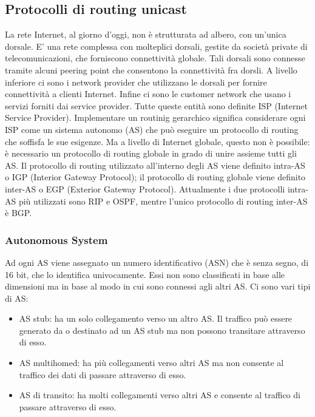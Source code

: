 \documentclass[12pt]{report}
\begin{document}
\subsection{Protocolli di routing unicast}
La rete Internet, al giorno d'oggi, non è strutturata ad albero, con un'unica dorsale. E' una rete complessa con molteplici dorsali, gestite da società private di telecomunicazioni, che forniscono connettività globale. Tali dorsali sono connesse tramite alcuni peering point che consentono la connettività fra dorsli. A livello inferiore ci sono i network provider che utilizzano le dorsali per fornire connettività a clienti Internet. Infine ci sono le customer network che usano i servizi forniti dai service provider. Tutte queste entità sono definite ISP (Internet Service Provider). Implementare un routinig gerarchico significa considerare ogni ISP come un sistema autonomo (AS) che può eseguire un protocollo di routing che soffisfa le sue esigenze. Ma a livello di Internet globale, questo non è possibile: è necessario un protocollo di routing globale in grado di unire assieme tutti gli AS. Il protocollo di routing utilizzato all'interno degli AS viene definito intra-AS o IGP (Interior Gateway Protocol); il protocollo di routing globale viene definito inter-AS o EGP (Exterior Gateway Protocol). Attualmente i due protocolli intra-AS più utilizzati sono RIP e OSPF, mentre l'unico protocollo di routing inter-AS è BGP.

\subsubsection{Autonomous System}
Ad ogni AS viene assegnato un numero identificativo (ASN) che è senza segno, di 16 bit, che lo identifica univocamente. Essi non sono classificati in base alle dimensioni ma in base al modo in cui sono connessi agli altri AS. Ci sono vari tipi di AS:
\begin{itemize}
	\item AS stub: ha un solo collegamento verso un altro AS. Il traffico può essere generato da o destinato ad un AS stub ma non possono transitare attraverso di esso.
	\item AS multihomed: ha più collegamenti verso altri AS ma non consente al traffico dei dati di passare attraverso di esso.
	\item AS di transito: ha molti collegamenti verso altri AS e consente al traffico di passare attraverso di esso.
\end{itemize}
\end{document}
